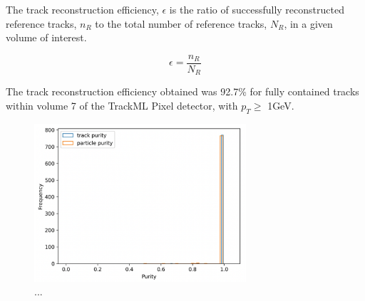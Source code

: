 The track reconstruction efficiency, $\epsilon$ is the ratio of successfully reconstructed reference tracks, $n_R$ to the total number of reference tracks, $N_R$, in a given volume of interest. 

\begin{equation}
    \epsilon = \frac{n_R}{N_R}
    \label{eqn:reoncstruction-eff}
\end{equation}

The track reconstruction efficiency obtained was 92.7\% for fully contained tracks within volume 7 of the TrackML Pixel detector, with $p_{T} \geq$ 1GeV. 



\begin{figure}[htbp]
    \centering
    \includegraphics[width=0.7\textwidth]{images/7-results/endcap-purity.png}
    \caption{...}
    \label{fig:trackml-results-endcap-nodes-purity}%
\end{figure}




